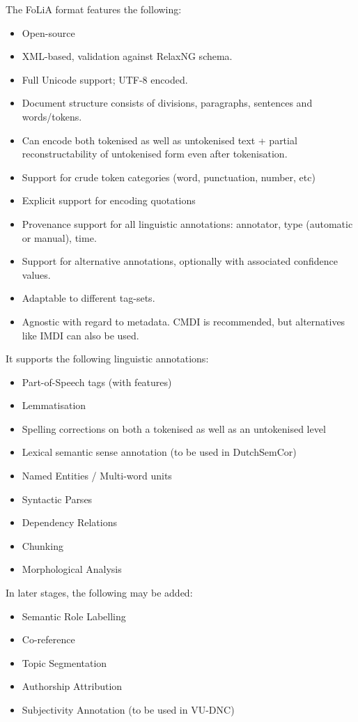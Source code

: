 \documentclass[a4paper,12pt]{report}
\begin{document}
The FoLiA format features the following:

\begin{itemize}
\item Open-source
\item XML-based, validation against RelaxNG schema.
\item Full Unicode support; UTF-8 encoded.
\item Document structure consists of divisions, paragraphs, sentences and words/tokens.
\item Can encode both tokenised as well as untokenised text + partial reconstructability of untokenised form even after tokenisation.
\item Support for crude token categories (word, punctuation, number, etc)
\item Explicit support for encoding quotations
\item Provenance support for all linguistic annotations: annotator, type (automatic or manual), time.
\item Support for alternative annotations, optionally with associated confidence values.
\item Adaptable to different tag-sets.
\item Agnostic with regard to metadata. CMDI is recommended, but alternatives like IMDI can also be used.
\end{itemize}

It supports the following linguistic annotations:

\begin{itemize}
\item Part-of-Speech tags (with features)
\item Lemmatisation
\item Spelling corrections on both a tokenised as well as an untokenised level
\item Lexical semantic sense annotation (to be used in DutchSemCor)
\item Named Entities / Multi-word units
\item Syntactic Parses
\item Dependency Relations
\item Chunking
\item Morphological Analysis

\end{itemize}

In later stages, the following may be added:

\begin{itemize}
\item Semantic Role Labelling
\item Co-reference
\item Topic Segmentation
\item Authorship Attribution
\item Subjectivity Annotation (to be used in VU-DNC)
\end{itemize}
\end{document}
